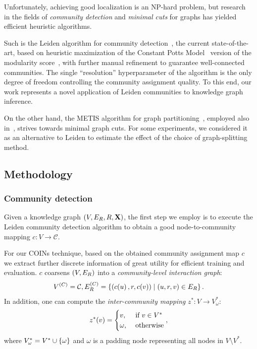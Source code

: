 Unfortunately, achieving good localization is an NP-hard problem, but research in the fields of \emph{community detection} and \emph{minimal cuts} for graphs has yielded efficient heuristic algorithms. 

Such is the Leiden algorithm for community detection~\cite{traag_louvain_2019}, the current state-of-the-art, based on heuristic maximization of the Constant Potts Model~\cite{traag_narrow_2011} version of the modularity score~\cite{blondel_fast_2008}, with further manual refinement to guarantee well-connected communities. The single \enquote{resolution} hyperparameter of the algorithm is the only degree of freedom controlling the community assignment quality. To this end, our work represents a novel application of Leiden communities to knowledge graph inference. 

On the other hand, the METIS algorithm for graph partitioning~\cite{karypis_fast_1998}, employed also in~\cite{zheng_dgl-ke_2020}, strives towards minimal graph cuts. For some experiments, we considered it as an alternative to Leiden to estimate the effect of the choice of graph-splitting method.

\subsection{Methodology}
\label{sec:methodology}

\subsubsection{Community detection}

Given a knowledge graph $\mathopen{}\left(V, E_R, R, \mathbf{X}\right)$, the first step we employ is to execute the Leiden community detection algorithm to obtain a good node-to-community mapping $c: V \to \mathcal{C}$. 

For our COINs technique, based on the obtained community assignment map $c$ we extract further discrete information of great utility for efficient training and evaluation. $c$ coarsens $\mathopen{}\left(V, E_R\right)$ into a \emph{community-level interaction graph}: 
\begin{equation}
V^{\mathopen{}\left(C\right)} = \mathcal{C}, E^{\mathopen{}\left(C\right)}_R = \mathopen{}\left\{\mathopen{}\left(c\mathopen{}\left(u\right),r,c\mathopen{}\left(v\right)\right) \mid \mathopen{}\left(u,r,v\right) \in E_R\right\}.    
\end{equation}
In addition, one can compute the \emph{inter-community mapping} $z^*: V \to V_{\omega}^*$:
\begin{equation}
    z^*\mathopen{}\left(v\right)=\begin{cases} v, & \text{ if } v \in V^* \\ \omega, & \text{ otherwise} \end{cases},
\end{equation}
where $V_{\omega}^* = V^* \cup \mathopen{}\left\{\omega\right\}$ and $\omega$ is a padding node representing all nodes in $V \setminus V^*$.

